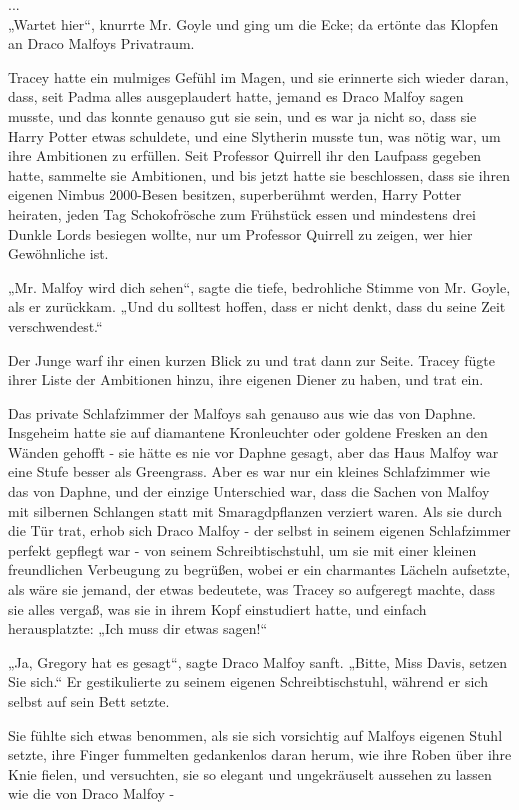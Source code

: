{...\\ „Wartet hier“, knurrte Mr. Goyle und ging um die Ecke; da ertönte das Klopfen an Draco Malfoys Privatraum.

Tracey hatte ein mulmiges Gefühl im Magen, und sie erinnerte sich wieder daran, dass, seit Padma alles ausgeplaudert hatte, jemand es Draco Malfoy sagen musste, und das konnte genauso gut sie sein, und es war ja nicht so, dass sie Harry Potter etwas schuldete, und eine Slytherin musste tun, was nötig war, um ihre Ambitionen zu erfüllen. Seit Professor Quirrell ihr den Laufpass gegeben hatte, sammelte sie Ambitionen, und bis jetzt hatte sie beschlossen, dass sie ihren eigenen Nimbus 2000-Besen besitzen, superberühmt werden, Harry Potter heiraten, jeden Tag Schokofrösche zum Frühstück essen und mindestens drei Dunkle Lords besiegen wollte, nur um Professor Quirrell zu zeigen, wer hier Gewöhnliche ist.

„Mr. Malfoy wird dich sehen“, sagte die tiefe, bedrohliche Stimme von Mr. Goyle, als er zurückkam. „Und du solltest hoffen, dass er nicht denkt, dass du seine Zeit verschwendest.“

Der Junge warf ihr einen kurzen Blick zu und trat dann zur Seite. Tracey fügte ihrer Liste der Ambitionen hinzu, ihre eigenen Diener zu haben, und trat ein.

Das private Schlafzimmer der Malfoys sah genauso aus wie das von Daphne. Insgeheim hatte sie auf diamantene Kronleuchter oder goldene Fresken an den Wänden gehofft - sie hätte es nie vor Daphne gesagt, aber das Haus Malfoy war eine Stufe besser als Greengrass. Aber es war nur ein kleines Schlafzimmer wie das von Daphne, und der einzige Unterschied war, dass die Sachen von Malfoy mit silbernen Schlangen statt mit Smaragdpflanzen verziert waren. Als sie durch die Tür trat, erhob sich Draco Malfoy - der selbst in seinem eigenen Schlafzimmer perfekt gepflegt war - von seinem Schreibtischstuhl, um sie mit einer kleinen freundlichen Verbeugung zu begrüßen, wobei er ein charmantes Lächeln aufsetzte, als wäre sie jemand, der etwas bedeutete, was Tracey so aufgeregt machte, dass sie alles vergaß, was sie in ihrem Kopf einstudiert hatte, und einfach herausplatzte: „Ich muss dir etwas sagen!“

„Ja, Gregory hat es gesagt“, sagte Draco Malfoy sanft. „Bitte, Miss Davis, setzen\\ Sie sich.“ Er gestikulierte zu seinem eigenen Schreibtischstuhl, während er sich selbst auf sein Bett setzte.

Sie fühlte sich etwas benommen, als sie sich vorsichtig auf Malfoys eigenen Stuhl setzte, ihre Finger fummelten gedankenlos daran herum, wie ihre Roben über ihre Knie fielen, und versuchten, sie so elegant und ungekräuselt aussehen zu lassen wie die von Draco Malfoy -

}
